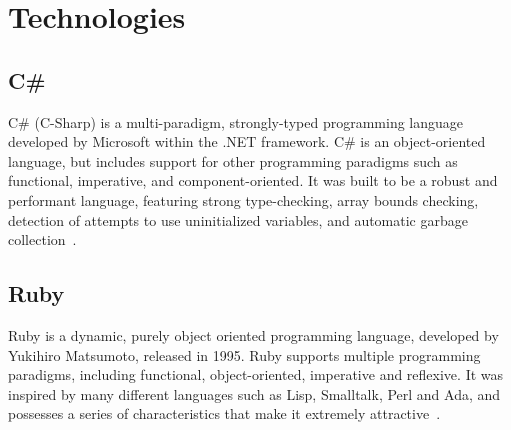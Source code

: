 \chapter{Technologies}\label{chap:technologies}

\section{C\#}\label{sec:csharp}

C\# (C-Sharp) is a multi-paradigm, strongly-typed programming language developed by Microsoft within the .NET framework. C\# is an object-oriented language, but includes support for other programming paradigms such as functional, imperative, and component-oriented. It was built to be a robust and performant language, featuring strong type-checking, array bounds checking, detection of attempts to use uninitialized variables, and automatic garbage collection~\cite{csharp}.

\section{Ruby}\label{sec:technologies:ruby}

Ruby is a dynamic, purely object oriented programming language, developed by Yukihiro Matsumoto, released in 1995. Ruby supports multiple programming paradigms, including functional, object-oriented, imperative and reflexive. It was inspired by many different languages such as Lisp, Smalltalk, Perl and Ada, and possesses a series of characteristics that make it extremely attractive~\cite{ruby}.

